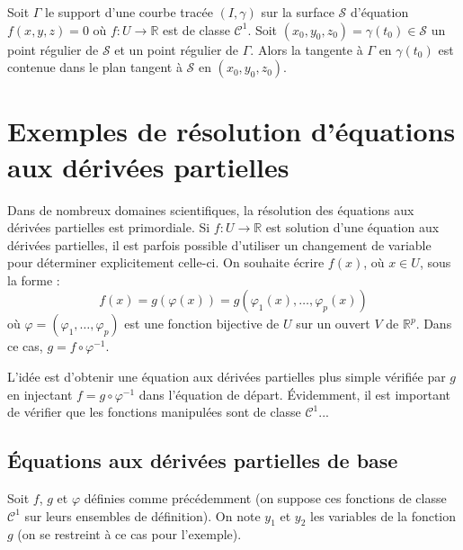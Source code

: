 \documentclass[french,11pt,twoside]{VcCours}
\begin{document}
\begin{Proposition}{} Soit $\Gamma$ le support d'une courbe tracée $(I, \gamma)$ sur la surface $\mathcal{S}$ d'équation $f(x,y,z)=0$ où $f : U \rightarrow \mathbb{R}$ est de classe $\mathcal{C}^1$.  Soit $(x_0,y_0,z_0)= \gamma(t_0)  \in \mathcal{S}$ un point régulier de $\mathcal{S}$ et un point régulier de $\Gamma$. Alors la tangente à $\Gamma$ en $\gamma(t_0)$ est contenue dans le plan tangent à $\mathcal{S}$ en $(x_0,y_0,z_0)$.
\end{Proposition}

%



\section{Exemples de résolution d'équations aux dérivées partielles}
Dans de nombreux domaines scientifiques, la résolution des équations aux dérivées partielles est primordiale. Si $f : U \rightarrow \mathbb{R}$ est solution d'une équation aux dérivées partielles, il est parfois possible d'utiliser un changement de variable pour déterminer explicitement celle-ci. On souhaite écrire $f(x)$, où $x \in U$, sous la forme :
$$ f(x) = g(\varphi(x)) = g(\varphi_1(x), \ldots, \varphi_p(x))$$
où $\varphi= (\varphi_1, \ldots, \varphi_p)$ est une fonction bijective de $U$ sur un ouvert $V$ de $\mathbb{R}^p$. Dans ce cas, $g = f \circ \varphi^{-1}$. 

\medskip

L'idée est d'obtenir une équation aux dérivées partielles plus simple vérifiée par $g$ en \og injectant \fg $f= g \circ \varphi^{-1}$ dans l'équation de départ. Évidemment, il est important de vérifier que les fonctions manipulées sont de classe $\mathcal{C}^1$...

\subsection{Équations aux dérivées partielles de base}
Soit $f$, $g$ et $\varphi$ définies comme précédemment (on suppose ces fonctions de classe $\mathcal{C}^1$ sur leurs ensembles de définition). On note $y_1$ et $y_2$ les variables de la fonction $g$ (on se restreint à ce cas pour l'exemple).
\end{document}
